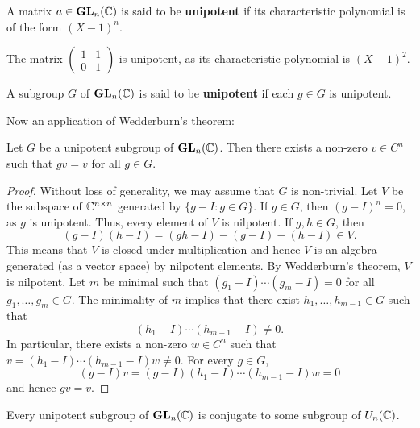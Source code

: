 \begin{definition}
    A matrix $a\in\mathbf{GL}_n(\mathbb{C})$ is said to be \textbf{unipotent} 
    if its characteristic polynomial is of the form 
    $(X-1)^n$. 
\end{definition}

The matrix $\begin{pmatrix}1&1\\0&1\end{pmatrix}$ is unipotent, 
as its characteristic polynomial is $(X-1)^2$. 

\begin{definition}
    A subgroup $G$ of $\mathbf{GL}_n(\mathbb{C})$ is said to be \textbf{unipotent} if
    each $g\in G$ is unipotent. 
\end{definition}

Now an application of Wedderburn's theorem:

\begin{proposition}
\label{pro:unipotent}
    Let $G$ be a unipotent subgroup of $\mathbf{GL}_n(\mathbb{C})$. 
    Then there exists a non-zero 
    $v\in C^{n}$ such that $gv=v$ for all $g\in G$. 
\end{proposition}

\begin{proof}
    Without loss of generality, we may assume that $G$ is non-trivial. 
    Let $V$ be the subspace of $\mathbb{C}^{n\times n}$ 
    generated by $\{g-I:g\in G\}$. If $g\in G$, then 
    $(g-I)^n=0$, as $g$ is unipotent. Thus,
    every element of $V$ is nilpotent. If $g,h\in G$, 
    then 
    \[
    (g-I)(h-I)=(gh-I)-(g-I)-(h-I)\in V.
    \]
    This means that $V$ is closed under multiplication and
    hence $V$ is an algebra generated (as a vector space)
    by nilpotent elements. By Wedderburn's theorem, 
    $V$ is nilpotent. Let $m$ be minimal 
    such that 
    $(g_1-I)\cdots (g_m-I)=0$ 
    for all $g_1,\dots,g_m\in G$. The minimality of $m$ implies that  
    there exist $h_1,\dots,h_{m-1}\in G$ such that 
    \[
    (h_1-I)\cdots (h_{m-1}-I)\ne 0.
    \]
    In particular, there exists a non-zero 
    $w\in C^{n}$ such that 
    $v=(h_1-I)\cdots (h_{m-1}-I)w\ne 0$. For every 
    $g\in G$, 
    \[
    (g-I)v=(g-I)(h_1-I)\cdots (h_{m-1}-I)w=0
    \]
    and hence $gv=v$. 
\end{proof}

\begin{theorem}[Kolchin]
\label{thm:Kolchin}
Every unipotent subgroup of $\mathbf{GL}_n(\mathbb{C})$ is conjugate
to some subgroup of $U_n(\mathbb{C})$. 
\end{theorem}

